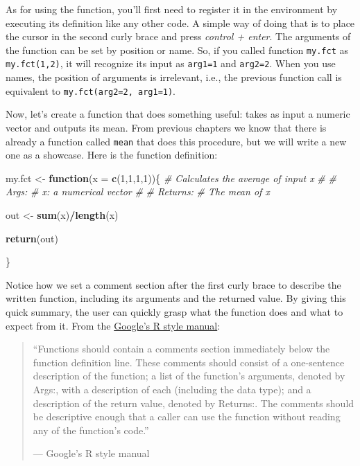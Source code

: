 \documentclass[11pt,]{book}
\newenvironment{Shaded}{\begin{snugshade}}{\end{snugshade}}
\newcommand{\KeywordTok}[1]{\textcolor[rgb]{0.27,0.27,0.27}{\textbf{#1}}}
\newcommand{\DataTypeTok}[1]{\textcolor[rgb]{0.27,0.27,0.27}{#1}}
\newcommand{\DecValTok}[1]{\textcolor[rgb]{0.06,0.06,0.06}{#1}}
\newcommand{\StringTok}[1]{\textcolor[rgb]{0.5,0.5,0.5}{#1}}
\newcommand{\CommentTok}[1]{\textcolor[rgb]{0.56,0.35,0.01}{\textit{#1}}}
\newcommand{\ControlFlowTok}[1]{\textcolor[rgb]{0.13,0.29,0.53}{\textbf{#1}}}
\newcommand{\OperatorTok}[1]{\textcolor[rgb]{0.81,0.36,0.00}{\textbf{#1}}}
\newcommand{\NormalTok}[1]{#1}
\begin{document}
As for using the function, you'll first need to register it in the
environment by executing its definition like any other code. A simple
way of doing that is to place the cursor in the second curly brace and
press \emph{control + enter}. The arguments of the function can be set
by position or name. So, if you called function \texttt{my.fct} as
\texttt{my.fct(1,2)}, it will recognize its input as \texttt{arg1=1} and
\texttt{arg2=2}. When you use names, the position of arguments is
irrelevant, i.e., the previous function call is equivalent to
\texttt{my.fct(arg2=2,\ arg1=1)}.

Now, let's create a function that does something useful: takes as input
a numeric vector and outputs its mean. From previous chapters we know
that there is already a function called \texttt{mean} that does this
procedure, but we will write a new one as a showcase. Here is the
function definition:

\begin{Shaded}
\begin{Highlighting}[]
\NormalTok{my.fct <-}\StringTok{ }\ControlFlowTok{function}\NormalTok{(}\DataTypeTok{x =} \KeywordTok{c}\NormalTok{(}\DecValTok{1}\NormalTok{,}\DecValTok{1}\NormalTok{,}\DecValTok{1}\NormalTok{,}\DecValTok{1}\NormalTok{))\{}
  \CommentTok{# Calculates the average of input x}
  \CommentTok{#}
  \CommentTok{# Args: }
  \CommentTok{#     x: a numerical vector}
  \CommentTok{#}
  \CommentTok{# Returns:}
  \CommentTok{#   The mean of x}
  
\NormalTok{  out <-}\StringTok{ }\KeywordTok{sum}\NormalTok{(x)}\OperatorTok{/}\KeywordTok{length}\NormalTok{(x)}
  
  \KeywordTok{return}\NormalTok{(out)}
  
\NormalTok{\}}
\end{Highlighting}
\end{Shaded}

Notice how we set a comment section after the first curly brace to
describe the written function, including its arguments and the returned
value. By giving this quick summary, the user can quickly grasp what the
function does and what to expect from it. From the
\href{https://google.github.io/styleguide/Rguide.xml\#functionlanguage}{Google's
R style manual}:

\begin{quote}
``Functions should contain a comments section immediately below the
function definition line. These comments should consist of a
one-sentence description of the function; a list of the function's
arguments, denoted by Args:, with a description of each (including the
data type); and a description of the return value, denoted by Returns:.
The comments should be descriptive enough that a caller can use the
function without reading any of the function's code.''

--- Google's R style manual
\end{quote}
\end{document}
